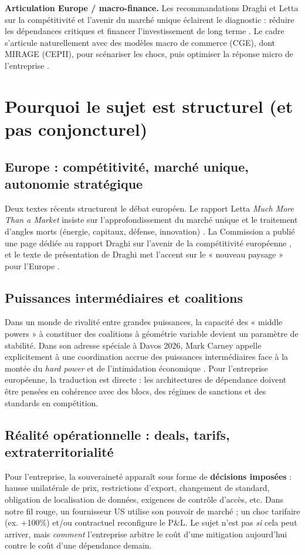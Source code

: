 \documentclass[11pt,a4paper]{article}
\begin{document}
\textbf{Articulation Europe / macro-finance.} Les recommandations Draghi et Letta sur la compétitivité et l’avenir du marché unique éclairent le diagnostic : réduire les dépendances critiques et financer l’investissement de long terme \citep{draghiEC,lettaReport}.
Le cadre s’articule naturellement avec des modèles macro de commerce (CGE), dont MIRAGE (CEPII), pour scénariser les chocs, puis optimiser la réponse micro de l’entreprise \citep{mirageSite,mirageDoc2026}.

\section{Pourquoi le sujet est structurel (et pas conjoncturel)}

\subsection{Europe : compétitivité, marché unique, autonomie stratégique}
Deux textes récents structurent le débat européen.
Le rapport Letta \emph{Much More Than a Market} insiste sur l’approfondissement du marché unique et le traitement d’angles morts (énergie, capitaux, défense, innovation) \citep{lettaReport}.
La Commission a publié une page dédiée au rapport Draghi sur l’avenir de la compétitivité européenne \citep{draghiEC}, et le texte de présentation de Draghi met l’accent sur le « nouveau paysage » pour l’Europe \citep{draghiAddress}.


\subsection{Puissances intermédiaires et coalitions}
Dans un monde de rivalité entre grandes puissances, la capacité des « middle powers » à constituer des coalitions à géométrie variable devient un paramètre de stabilité.
Dans son adresse spéciale à Davos 2026, Mark Carney appelle explicitement à une coordination accrue des puissances intermédiaires face à la montée du \emph{hard power} et de l’intimidation économique \citep{carneyWEF2026}.
Pour l’entreprise européenne, la traduction est directe : les architectures de dépendance doivent être pensées en cohérence avec des blocs, des régimes de sanctions et des standards en compétition.


\subsection{Réalité opérationnelle : deals, tarifs, extraterritorialité}
Pour l’entreprise, la souveraineté apparaît sous forme de \textbf{décisions imposées} : hausse unilatérale de prix, restrictions d’export, changement de standard, obligation de localisation de données, exigences de contrôle d’accès, etc.
Dans notre fil rouge, un fournisseur US utilise son pouvoir de marché ; un choc tarifaire (ex. +100\%) et/ou contractuel reconfigure le P\&L. Le sujet n’est pas \emph{si} cela peut arriver, mais \emph{comment} l’entreprise arbitre le coût d’une mitigation aujourd’hui contre le coût d’une dépendance demain.
\end{document}
